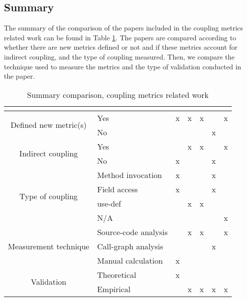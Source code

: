 \subsection{Summary}

The summary of the comparison of the papers included in the coupling metrics related work can be found in Table \ref{table:summary-coupling}. The papers are compared according to whether there are new metrics defined or not and if these metrics account for indirect coupling, and the type of coupling measured. Then, we compare the technique used to measure the metrics and the type of validation conducted in the paper.

\begin{table}[ht!]
\begin{center}

\begin{tabular}{|c|l|c|c|c|c|c|}
\hline
&  & \cite{Vernazza2000} & \cite{yang2005detecting} & \cite{Yang2010} & \cite{Allier2010} & \cite{Almugrin2016} \\ \hline\hline
\multirow{2}{*}{Defined new metric(s)} & Yes & x & x & x &  & x \\ \cline{2-7}
& No &  &  &  & x &  \\ \hline\hline
\multirow{2}{*}{Indirect coupling} & Yes &  & x & x &  & x \\ \cline{2-7}
& No & x &  &  & x &  \\ \hline\hline
\multirow{4}{*}{Type of coupling} & Method invocation & x &  &  & x &  \\ \cline{2-7}
& Field access & x &  &  & x &  \\ \cline{2-7}
& use-def &  & x & x &  &  \\ \cline{2-7}
& N/A &  &  &  &  & x \\ \hline\hline
\multirow{3}{*}{Measurement technique} & Source-code analysis &  & x & x &  & x \\ \cline{2-7}
& Call-graph analysis &  &  &  & x &  \\ \cline{2-7}
& Manual calculation & x &  &  &  &  \\ \hline\hline
\multirow{2}{*}{Validation} & Theoretical & x &  &  &  &  \\ \cline{2-7}
& Empirical &  & x & x & x & x \\ \hline
\end{tabular}

\end{center}
\caption{Summary comparison, coupling metrics related work}
\label{table:summary-coupling}
\end{table}

